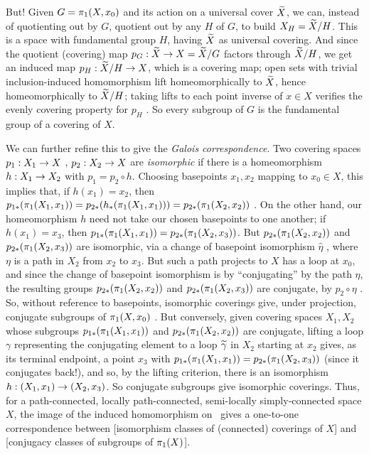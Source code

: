 \msk

But! Given $G=\pi_1(X,x_0)$ and its 
action on a universal cover $\widetilde{X}$, we can, instead of quotienting out by $G$,
quotient out by any  $H$ of $G$, to build $X_H=\widetilde{X}/H$. 
This is a space with fundamental group $H$, having $\widetilde{X}$ as universal covering.
And since the quotient (covering) map $p_G:\widetilde{X}\rightarrow X=\widetilde{X}/G$ factors through $\widetilde{X}/H$,
we get an induced map $p_H:\widetilde{X}/H\rightarrow X$, which is a covering map; open sets with
trivial inclusion-induced homomorphism lift homeomorphically to $\widetilde{X}$,
hence homeomorphically to $\widetilde{X}/H$; taking lifts to each point inverse of $x\in X$
verifies the evenly covering property for $p_H$ . So every subgroup of $G$ is the
fundamental group of a covering of $X$. 

\ssk

We can further refine this to give the {\it Galois correspondence}. Two covering spaces
$p_1:X_1\rightarrow X$ , $p_2:X_2\rightarrow X$ are {\it isomorphic} if there is a homeomorphism
$h:X_1\rightarrow X_2$ with $p_1=p_2\circ h$. Choosing basepoints $x_1,x_2$ mapping to $x_0\in X$,
this implies that, if $h(x_1)=x_2$, then $p_{1*}(\pi_1(X_1,x_1)) = p_{2*}(h_*(\pi_1(X_1,x_1))) = 
p_{2*}(\pi_1(X_2,x_2))$ . On the other hand, our homeomorphism $h$ need not take our
chosen basepoints to one another; if $h(x_1)=x_3$, then $p_{1*}(\pi_1(X_1,x_1)) = p_{2*}(\pi_1(X_2,x_3))$.
But  $p_{2*}(\pi_1(X_2,x_2))$ and $p_{2*}(\pi_1(X_2,x_3))$ are isomorphic, via a change 
of basepoint isomorphism $\widehat{\eta}$ , where $\eta$ is a path in $X_2$ from $x_2$ to $x_3$.
But such a path projects to $X$ has a loop at $x_0$, and since the change of basepoint isomorphism
is by ``conjugating'' by the path $\eta$, the resulting groups $p_{2*}(\pi_1(X_2,x_2))$ and $p_{2*}(\pi_1(X_2,x_3))$
are conjugate, by $p_2\circ \eta$ . So, without reference to basepoints, isomorphic coverings give,
under projection, conjugate subgroups of $\pi_1(X,x_0)$ . But conversely, given covering spaces
$X_1,X_2$ whose subgroups $p_{1*}(\pi_1(X_1,x_1))$ and $p_{2*}(\pi_1(X_2,x_2))$ are conjugate,
lifting a loop $\gamma$ representing the conjugating element to a loop $\widetilde{\gamma}$ in
$X_2$ starting at $x_2$ gives, as its terminal endpoint, a point $x_3$ with 
$p_{1*}(\pi_1(X_1,x_1)) = p_{2*}(\pi_1(X_2,x_3))$ (since it conjugates back!), and so, by the lifting criterion,
there is an isomorphism $h:(X_1,x_1) \rightarrow (X_2,x_3)$. So conjugate subgroups give isomorphic coverings.
Thus, for a path-connected, locally path-connected, semi-locally simply-connected space $X$,  
the image of the induced homomorphism on \mpu\ 
gives a one-to-one correspondence between 
[isomorphism classes of (connected) coverings of $X$] and 
[conjugacy classes of subgroups of $\pi_1(X)$].

